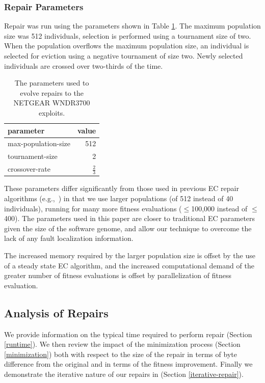 \documentclass{sigcomm-alternate}
\begin{document}
\subsubsection{Repair Parameters}
\label{sec:parameters}
Repair was run using the parameters shown in Table \ref{parameters}.  The
maximum population size was 512 individuals, selection is performed
using a tournament size of two.  When the population overflows the
maximum population size, an individual is selected for eviction using
a negative tournament of size two.  Newly selected individuals are
crossed over two-thirds of the time.

\begin{table}[htb]
\centering
\begin{tabular}{lr}
parameter           & value         \\
\hline
max-population-size & 512           \\
tournament-size     & 2             \\
crossover-rate      & $\frac{2}{3}$ \\
\end{tabular}\caption{\label{parameters}The parameters used to evolve repairs to the NETGEAR WNDR3700 exploits.}

\end{table}

These parameters differ significantly from those used in previous EC
repair algorithms
(e.g.,~\cite{forrest2009genetic,legoues2011systematicstudy,le2012representations})
in that we
use larger populations (of 512 instead of 40 individuals), running for
many more fitness evaluations ($\leq$100,000 instead of $\leq$400).  The
parameters used in this paper are closer to traditional EC
parameters given the size of the software genome, and allow our
technique to overcome the lack of any fault localization information.

The increased memory required by the larger population size is offset
by the use of a steady state EC algorithm, and the increased
computational demand of the greater number of fitness evaluations is
offset by parallelization of fitness evaluation.

\subsection{Analysis of Repairs}
\label{analysis}

We provide information on the typical time required to perform repair
(Section \ref{runtime}).  We then review the impact of the
minimization process (Section \ref{minimization}) both with respect to
the size of the repair in terms of byte difference from the original
and in terms of the fitness improvement.  Finally we demonstrate the
iterative nature of our repairs in (Section \ref{iterative-repair}).
\end{document}
